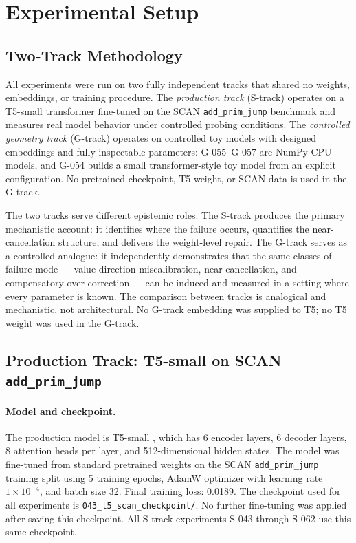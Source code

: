 \section{Experimental Setup}
\label{sec:setup}

\subsection{Two-Track Methodology}

All experiments were run on two fully independent tracks that shared no weights, embeddings,
or training procedure.
The \emph{production track} (S-track) operates on a T5-small transformer fine-tuned on
the SCAN \texttt{add\_prim\_jump} benchmark and measures real model behavior under controlled
probing conditions.
The \emph{controlled geometry track} (G-track) operates on controlled toy models with
designed embeddings and fully inspectable parameters: G-055--G-057 are NumPy CPU models,
and G-054 builds a small transformer-style toy model from an explicit configuration.
No pretrained checkpoint, T5 weight, or SCAN data is used in the G-track.

The two tracks serve different epistemic roles. The S-track produces the primary mechanistic
account: it identifies where the failure occurs, quantifies the near-cancellation structure,
and delivers the weight-level repair.
The G-track serves as a controlled analogue: it independently demonstrates that the same
classes of failure mode --- value-direction miscalibration, near-cancellation, and
compensatory over-correction --- can be induced and measured in a setting where every
parameter is known.
The comparison between tracks is analogical and mechanistic, not architectural.
No G-track embedding was supplied to T5; no T5 weight was used in the G-track.

\subsection{Production Track: T5-small on SCAN \texttt{add\_prim\_jump}}

\paragraph{Model and checkpoint.}
The production model is T5-small \citep{raffel2020t5}, which has 6 encoder layers,
6 decoder layers, 8 attention heads per layer, and 512-dimensional hidden states.
The model was fine-tuned from standard pretrained weights on the SCAN
\texttt{add\_prim\_jump} training split \citep{lake2018scan} using 5 training epochs,
AdamW optimizer with learning rate $1 \times 10^{-4}$, and batch size 32.
Final training loss: 0.0189. The checkpoint used for all experiments is
\texttt{043\_t5\_scan\_checkpoint/}. No further fine-tuning was applied after saving
this checkpoint. All S-track experiments S-043 through S-062 use this same checkpoint.

